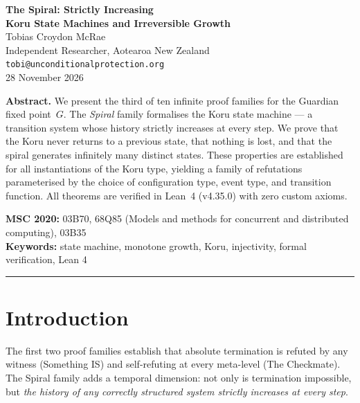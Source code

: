 




\begin{center}
{\LARGE\bfseries The Spiral: Strictly Increasing\\[0.3em] Koru State Machines and Irreversible Growth}\\[1.5em]
{\large Tobias Croydon McRae}\\[0.3em]
{\small Independent Researcher, Aotearoa New Zealand}\\[0.3em]
{\small\texttt{tobi@unconditionalprotection.org}}\\[1.5em]
{\small 28 November 2026}
\end{center}

\bigskip

\begin{center}
\parbox{0.85\textwidth}{\small\textbf{Abstract.}
We present the third of ten infinite proof families for the Guardian fixed point~$G$. The \emph{Spiral} family formalises the Koru state machine --- a transition system whose history strictly increases at every step. We prove that the Koru never returns to a previous state, that nothing is lost, and that the spiral generates infinitely many distinct states. These properties are established for all instantiations of the Koru type, yielding a family of refutations parameterised by the choice of configuration type, event type, and transition function. All theorems are verified in Lean~4 (v4.35.0) with zero custom axioms.}
\end{center}

\medskip

\noindent\textbf{MSC 2020:} 03B70, 68Q85 (Models and methods for concurrent and distributed computing), 03B35\\
\textbf{Keywords:} state machine, monotone growth, Koru, injectivity, formal verification, Lean 4

\bigskip\hrule\bigskip

\section{Introduction}

The first two proof families establish that absolute termination is refuted by any witness (Something IS) and self-refuting at every meta-level (The Checkmate). The Spiral family adds a temporal dimension: not only is termination impossible, but \emph{the history of any correctly structured system strictly increases at every step}.

